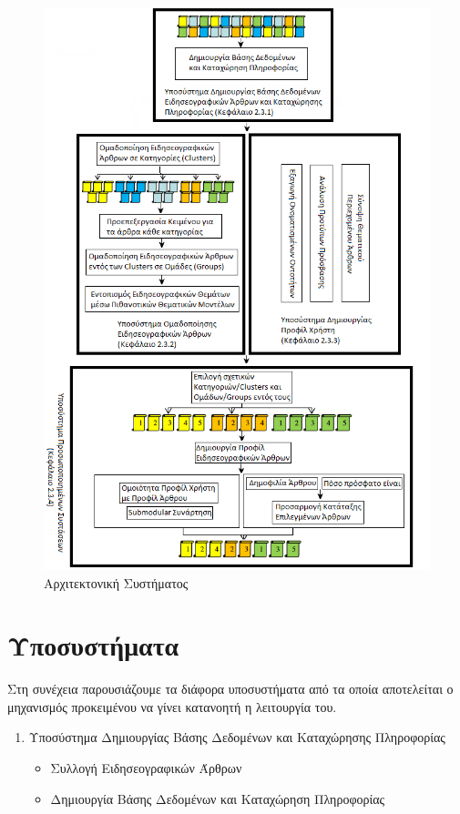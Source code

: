 {\begin{figure}[!ht] \centering
    \includegraphics[scale=0.77]{static/figures/arch1.png}
    \caption{Αρχιτεκτονική Συστήματος}
    \label{}
\end{figure} 

\section{Υποσυστήματα}

Στη συνέχεια παρουσιάζουμε τα διάφορα υποσυστήματα από τα οποία αποτελείται ο
μηχανισμός προκειμένου να γίνει κατανοητή η λειτουργία του.

\begin{enumerate}

  \item Υποσύστημα Δημιουργίας Βάσης Δεδομένων και Καταχώρησης Πληροφορίας
    \begin{itemize}
      \item{Συλλογή Ειδησεογραφικών Άρθρων}
      \item{Δημιουργία Βάσης Δεδομένων και Καταχώρηση Πληροφορίας}
      \end{itemize}
  

\end{enumerate}}
